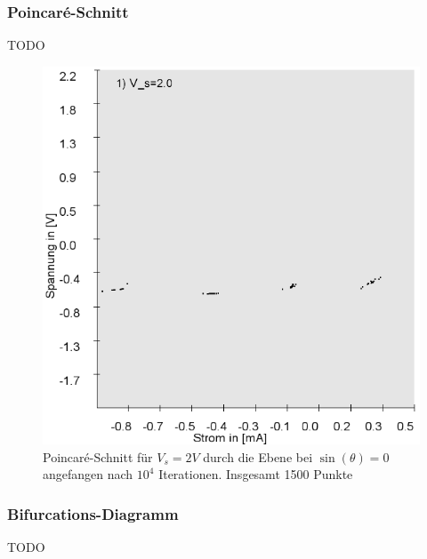 \documentclass{scrartcl}
\begin{document}
\subsubsection{Poincaré-Schnitt}
TODO
\begin{figure}
\includegraphics[scale=0.5]{Poincare-nach10000iterations}
\caption{Poincaré-Schnitt für $V_s=2V$ durch die Ebene bei $\sin(\theta)=0$ angefangen nach $10^4$ Iterationen. Insgesamt 1500 Punkte}
\label{fig:ldr-prd}
\end{figure}

\subsubsection{Bifurcations-Diagramm}
TODO
\end{document}
